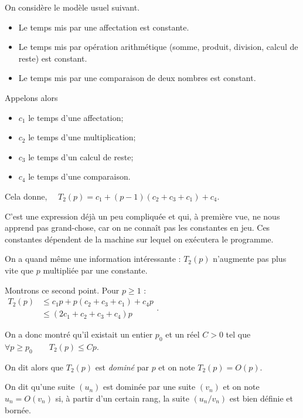 On considère le modèle usuel suivant.

\begin{itemize}
\item[\textbullet] Le temps mis par une affectation est constante.
\item[\textbullet] Le temps mis par opération arithmétique (somme, produit,
  division, calcul de reste) est constant.
\item[\textbullet] Le temps mis par une comparaison de deux nombres est constant.
\end{itemize}

Appelons alors
\begin{itemize}
\item[\textbullet] $c_{1}$ le temps d'une affectation;
\item[\textbullet] $c_{2}$ le temps d'une multiplication;
\item[\textbullet] $c_{3}$ le temps d'un calcul de reste;
\item[\textbullet] $c_{4}$ le temps d'une comparaison.
\end{itemize}

Cela donne,
$ \quad   T_{2}(p) = c_{1} + (p-1) (c_{2} + c_{3} + c_{1}) + c_{4}$.


C'est une expression déjà un peu compliquée et qui, à première vue,  ne nous apprend pas grand-chose, car on ne  connaît pas les constantes en jeu.
Ces constantes dépendent de la machine sur lequel on  exécutera le programme. 

On a quand même une information intéressante : $T_{2}(p)$ n'augmente pas plus vite que $p$ multipliée par une constante.

Montrons ce second point. Pour $p\geq 1$ : 
$ \begin{array}{ll}
  T_{2}(p) &\leq c_{1}p + p(c_{2}+c_{3}+c_{1})+c_{4}p\\
  &\leq (2c_{1}+c_{2}+c_{3}+c_{4})p
  \end{array}$.
  


On a donc montré qu'il existait un entier $p_{0}$ et un réel $C>0$ tel que
$  \forall p\geq p_0 \qquad T_{2}(p)\leq Cp$.

On dit alors que $T_{2}(p)$ est \emph{dominé} par $p$ et on note
$  T_{2}(p) = O(p)$.

\begin{defi}{}
  On dit qu'une suite $(u_{n})$ est dominée par une suite $(v_{n})$ et
  on note $u_{n} = O(v_{n})$ si,  à partir d'un certain rang, la suite
  $(u_{n}/v_{n})$ est bien définie et bornée.  
\end{defi}

